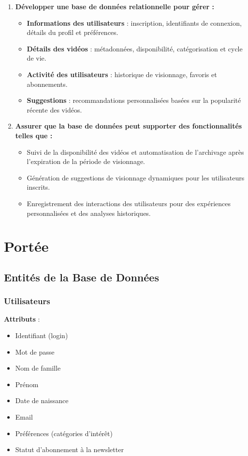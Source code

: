 \documentclass[a4paper,12pt]{article}
\begin{document}
\begin{enumerate}
    \item \textbf{Développer une base de données relationnelle pour gérer :}
    \begin{itemize}
        \item \textbf{Informations des utilisateurs} : inscription, identifiants de connexion, détails du profil et préférences.
        \item \textbf{Détails des vidéos} : métadonnées, disponibilité, catégorisation et cycle de vie.
        \item \textbf{Activité des utilisateurs} : historique de visionnage, favoris et abonnements.
        \item \textbf{Suggestions} : recommandations personnalisées basées sur la popularité récente des vidéos.
    \end{itemize}
    \item \textbf{Assurer que la base de données peut supporter des fonctionnalités telles que :}
    \begin{itemize}
        \item Suivi de la disponibilité des vidéos et automatisation de l'archivage après l'expiration de la période de visionnage.
        \item Génération de suggestions de visionnage dynamiques pour les utilisateurs inscrits.
        \item Enregistrement des interactions des utilisateurs pour des expériences personnalisées et des analyses historiques.
    \end{itemize}
\end{enumerate}

\section{Portée}

\subsection{Entités de la Base de Données}

\subsubsection{Utilisateurs}

\textbf{Attributs} :
\begin{itemize}
    \item Identifiant (login)
    \item Mot de passe
    \item Nom de famille
    \item Prénom
    \item Date de naissance
    \item Email
    \item Préférences (catégories d'intérêt)
    \item Statut d'abonnement à la newsletter
\end{itemize}
\end{document}
